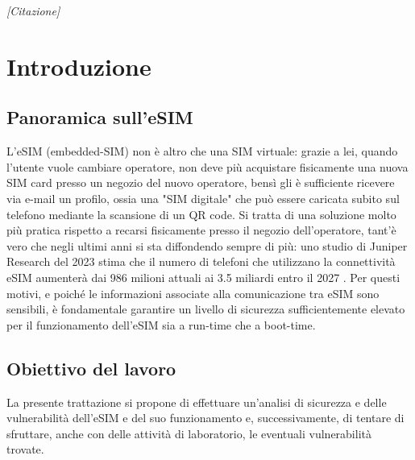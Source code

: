 \documentclass[10pt, twoside, openany]{book}
\begin{document}
\begin{frontespizio}
\end{frontespizio}

\begin{flushright}
\null{}
\textit{[Citazione]}
\null
\end{flushright}

\tableofcontents
\listoffigures
\listoftables

\chapter{Introduzione}
\section{Panoramica sull'eSIM}
L'eSIM (embedded-SIM) non è altro che una SIM virtuale: grazie a lei, quando l'utente vuole cambiare operatore, non deve più acquistare fisicamente una nuova SIM card presso un negozio del nuovo operatore, bensì gli è sufficiente ricevere via e-mail un profilo, ossia una "SIM digitale" che può essere caricata subito sul telefono mediante la scansione di un QR code. Si tratta di una soluzione molto più pratica rispetto a recarsi fisicamente presso il negozio dell'operatore, tant'è vero che negli ultimi anni si sta diffondendo sempre di più: uno studio di Juniper Research del 2023 stima che il numero di telefoni che utilizzano la connettività eSIM aumenterà dai 986 milioni attuali ai 3.5 miliardi entro il 2027 \cite{Corcom}. Per questi motivi, e poiché le informazioni associate alla comunicazione tra eSIM sono sensibili, è fondamentale garantire un livello di sicurezza sufficientemente elevato per il funzionamento dell'eSIM sia a run-time che a boot-time.

\section{Obiettivo del lavoro}
La presente trattazione si propone di effettuare un'analisi di sicurezza e delle vulnerabilità dell'eSIM e del suo funzionamento e, successivamente, di tentare di sfruttare, anche con delle attività di laboratorio, le eventuali vulnerabilità trovate.
\end{document}
